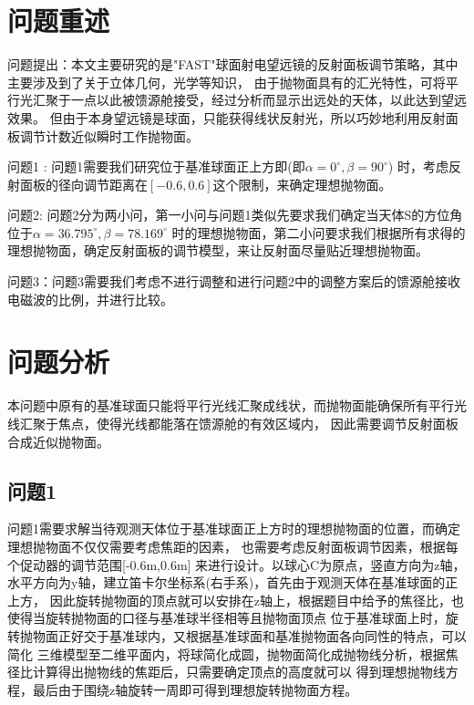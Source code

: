 \documentclass[withoutpreface,bwprint]{cumcmthesis} %
\begin{document}
        \section{问题重述}

   问题提出：本文主要研究的是"FAST"球面射电望远镜的反射面板调节策略，其中主要涉及到了关于立体几何，光学等知识，
   由于抛物面具有的汇光特性，可将平行光汇聚于一点以此被馈源舱接受，经过分析而显示出远处的天体，以此达到望远效果。
   但由于本身望远镜是球面，只能获得线状反射光，所以巧妙地利用反射面板调节计数近似瞬时工作抛物面。

   问题1 : 问题1需要我们研究位于基准球面正上方即(即$\alpha=0^\circ,\beta = 90^\circ $)
   时，考虑反射面板的径向调节距离在$[-0.6,0.6]$这个限制，来确定理想抛物面。

     问题2:  问题2分为两小问，第一小问与问题1类似先要求我们确定当天体S的方位角位于$\alpha = 36.795^\circ , \beta = 78.169^\circ$
     时的理想抛物面，第二小问要求我们根据所有求得的理想抛物面，确定反射面板的调节模型，来让反射面尽量贴近理想抛物面。 

     
问题3：问题3需要我们考虑不进行调整和进行问题2中的调整方案后的馈源舱接收电磁波的比例，并进行比较。


        \section{问题分析}
            本问题中原有的基准球面只能将平行光线汇聚成线状，而抛物面能确保所有平行光线汇聚于焦点，使得光线都能落在馈源舱的有效区域内，
        因此需要调节反射面板合成近似抛物面。
    
		\subsection{问题1}

        问题1需要求解当待观测天体位于基准球面正上方时的理想抛物面的位置，而确定理想抛物面不仅仅需要考虑焦距的因素，
        也需要考虑反射面板调节因素，根据每个促动器的调节范围[-0.6m,0.6m]
        来进行设计。以球心C为原点，竖直方向为z轴，水平方向为y轴，建立笛卡尔坐标系(右手系)，首先由于观测天体在基准球面的正上方，
        因此旋转抛物面的顶点就可以安排在z轴上，根据题目中给予的焦径比，也使得当旋转抛物面的口径与基准球半径相等且抛物面顶点
        位于基准球面上时，旋转抛物面正好交于基准球内，又根据基准球面和基准抛物面各向同性的特点，可以简化
        三维模型至二维平面内，将球简化成圆，抛物面简化成抛物线分析，根据焦径比计算得出抛物线的焦距后，只需要确定顶点的高度就可以
        得到理想抛物线方程，最后由于围绕z轴旋转一周即可得到理想旋转抛物面方程。
        
\end{document}

